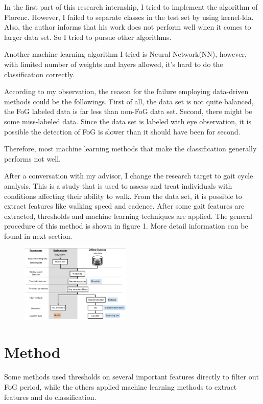 \documentclass[article]{article}
\begin{document}
    In the first part of this research internship, I tried to implement the algorithm of Florenc. However, I failed to separate classes in the test set by using kernel-lda. Also, the author informs that his work does not perform well when it comes to larger data set. So I tried to pursue other algorithms.
    
    Another machine learning algorithm I tried is Neural Network(NN), however, with limited number of weights and layers allowed, it's hard to do the classification correctly.
    
    According to my observation, the reason for the failure employing data-driven methods could be the followings. First of all, the data set is not quite balanced, the FoG labeled data is far less than non-FoG data set. Second, there might be some miss-labeled data. Since the data set is labeled with eye observation, it is possible the detection of FoG is slower than it should have been for second. 
    
    Therefore, most machine learning methods that make the classification generally performs not well.
    
    After a conversation with my advisor, I change the research target to gait cycle analysis. This is a study that is used to assess and treat individuals with conditions affecting their ability to walk. From the data set, it is possible to extract features like walking speed and cadence. After some gait features are extracted, thresholds and machine learning techniques are applied. The general procedure of this method is shown in figure 1. More detail information can be found in next section.
    
    
    \begin{figure}
    	\centering
    	\includegraphics[width=0.47\textwidth]{procedures}
    	\caption{}
    	\label{fig:y equals x}
    	
    \end{figure}
\section{Method}
    Some methods used thresholds on several important features directly to filter out FoG period, while the others applied machine learning methods to extract features and do classification.
\end{document}
